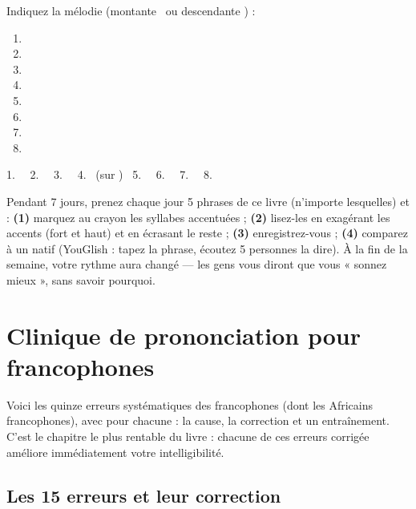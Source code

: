 \begin{exo}[6.4 --- Intonation]
Indiquez la mélodie (montante \monte\ ou descendante \descend) :
\begin{enumerate}
  \item {}
  \item {}
  \item {}
  \item {}
  \item {}
  \item {}
  \item {}
  \item {}
\end{enumerate}
\end{exo}
\begin{corrige}[6.4]
1. \monte\ \ 2. \descend\ \ 3. \descend\ \ 4. \monte\monte\descend\ (sur ) \
5. \monte\ \ 6. \monte\ \ 7. \descend\ \ 8. \descend
\end{corrige}

\begin{mission}
Pendant 7 jours, prenez chaque jour 5 phrases de ce livre (n'importe lesquelles) et :
\textbf{(1)} marquez au crayon les syllabes accentuées ; \textbf{(2)} lisez-les en exagérant
les accents (fort et haut) et en écrasant le reste ; \textbf{(3)} enregistrez-vous ;
\textbf{(4)} comparez à un natif (YouGlish : tapez la phrase, écoutez 5 personnes la dire).
À la fin de la semaine, votre rythme aura changé --- les gens vous diront que vous
« sonnez mieux », sans savoir pourquoi.
\end{mission}


\chapter{Clinique de prononciation pour francophones}

Voici les quinze erreurs systématiques des francophones (dont les Africains francophones),
avec pour chacune : la cause, la correction et un entraînement. C'est le chapitre le plus
rentable du livre : chacune de ces erreurs corrigée améliore immédiatement votre
intelligibilité.

\section{Les 15 erreurs et leur correction}

